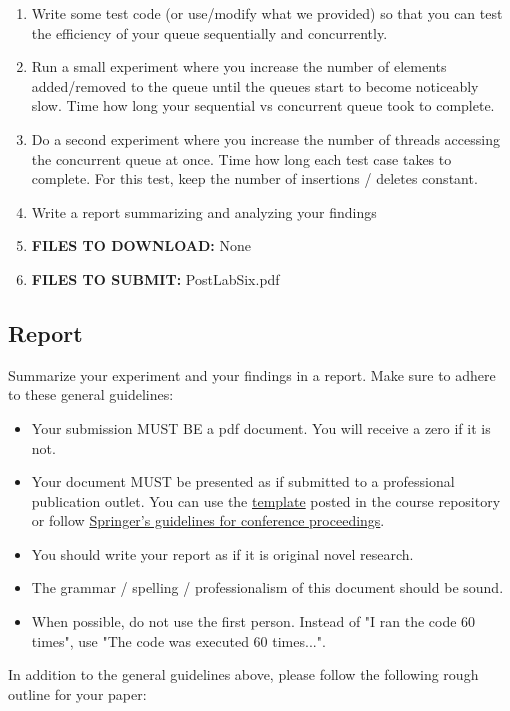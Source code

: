 \documentclass[paper=a4, fontsize=11pt, parskip=full]{scrartcl} %
\numberwithin{equation}{section} %
\numberwithin{figure}{section} %
\numberwithin{table}{section} %
\begin{document}
\begin{enumerate}
	\item Write some test code (or use/modify what we provided) so that you can test the efficiency of your queue sequentially and concurrently. 
	\item Run a small experiment where you increase the number of elements added/removed to the queue until the queues start to become noticeably slow. Time how long your sequential vs concurrent queue took to complete.
	\item Do a second experiment where you increase the number of threads accessing the concurrent queue at once. Time how long each test case takes to complete. For this test, keep the number of insertions / deletes constant.
	\item Write a report summarizing and analyzing your findings
	\item \textbf{FILES TO DOWNLOAD:} None
	\item \textbf{FILES TO SUBMIT:} PostLabSix.pdf
\end{enumerate}

\subsection{Report}

Summarize your experiment and your findings in a report. Make sure to adhere to these general guidelines:

\begin{itemize}
	\item Your submission MUST BE a pdf document. You will receive a zero if it is not.
	\item Your document MUST be presented as if submitted to a professional publication outlet. You can use the \href{https://github.com/markfloryan/dsa1}{template} posted in the course repository or follow \href{https://www.springer.com/us/computer-science/lncs/conference-proceedings-guidelines}{Springer's guidelines for conference proceedings}.
	\item You should write your report as if it is original novel research.
	\item The grammar / spelling / professionalism of this document should be sound.
	\item When possible, do not use the first person. Instead of "I ran the code 60 times", use "The code was executed 60 times...".
\end{itemize}

In addition to the general guidelines above, please follow the following rough outline for your paper:
\end{document}
